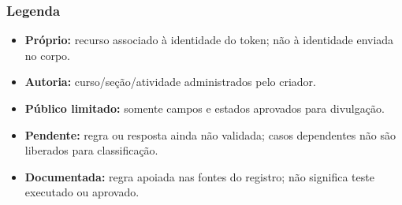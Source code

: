 \subsubsection{Legenda}\label{legenda}

\begin{itemize}
\tightlist
\item
  \textbf{Próprio:} recurso associado à identidade do token; não à
  identidade enviada no corpo.
\item
  \textbf{Autoria:} curso/\allowbreak{}seção/\allowbreak{}atividade administrados pelo criador.
\item
  \textbf{Público limitado:} somente campos e estados aprovados para
  divulgação.
\item
  \textbf{Pendente:} regra ou resposta ainda não validada; casos
  dependentes não são liberados para classificação.
\item
  \textbf{Documentada:} regra apoiada nas fontes do registro; não
  significa teste executado ou aprovado.
\end{itemize}

